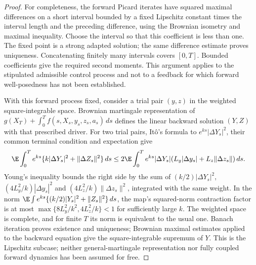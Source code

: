 \begin{proof}
For completeness, the forward Picard iterates have squared maximal differences on a short interval bounded by a fixed Lipschitz constant times the interval length and the preceding difference, using the Brownian isometry and maximal inequality. Choose the interval so that this coefficient is less than one. The fixed point is a strong adapted solution; the same difference estimate proves uniqueness. Concatenating finitely many intervals covers $[0,T]$. Bounded coefficients give the required second moments. This argument applies to the stipulated admissible control process and not to a feedback for which forward well-posedness has not been established.

With this forward process fixed, consider a trial pair $(y,z)$ in the weighted square-integrable space. Brownian martingale representation of
$g(X_T)+\int_0^T f(s,X_s,y_s,z_s,a_s)\,ds$
defines the linear backward solution $(Y,Z)$ with that prescribed driver. For two trial pairs, It\^o's formula to $e^{ks}|\Delta Y_s|^2$, their common terminal condition and expectation give
\[
 \E\int_0^T e^{ks}\{k|\Delta Y_s|^2+\|\Delta Z_s\|^2\}\,ds
 \le2\E\int_0^T e^{ks}|\Delta Y_s|
       (L_y|\Delta y_s|+L_z\|\Delta z_s\|)\,ds.
\]
Young's inequality bounds the right side by the sum of
$(k/2)|\Delta Y_s|^2$, $(4L_y^2/k)|\Delta y_s|^2$ and $(4L_z^2/k)\|\Delta z_s\|^2$, integrated with the same weight. In the norm
$\E\int e^{ks}\{(k/2)|Y_s|^2+\|Z_s\|^2\}\,ds$,
the map's squared-norm contraction factor is at most
$\max\{8L_y^2/k^2,4L_z^2/k\}<1$ for sufficiently large $k$.
The weighted space is complete, and for finite $T$ its norm is equivalent to the usual one. Banach iteration proves existence and uniqueness; Brownian maximal estimates applied to the backward equation give the square-integrable supremum of $Y$. This is the Lipschitz subcase; neither general-martingale representation nor fully coupled forward dynamics has been assumed for free.


\end{proof}
